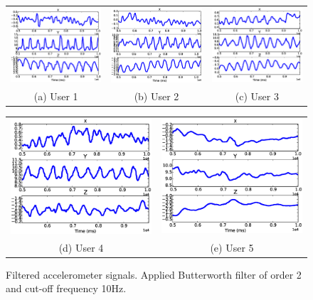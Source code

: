 \begin{figure}[t]
\begin{center}
\begin{tabular}{ccc}
\includegraphics [width=.33\linewidth]{fig/filer_sub1.eps}&
\includegraphics [width=.33\linewidth]{fig/filer_sub8.eps}&
\includegraphics [width=.33\linewidth]{fig/filer_sub3.eps}\\
(a) User 1& (b) User 2 & (c) User 3 \\
\end{tabular}

\begin{tabular}{cc}
\includegraphics [width=.33\linewidth]{fig/filer_sub4.eps}&
\includegraphics [width=.33\linewidth]{fig/filer_sub5.eps}\\
(d) User 4& (e) User 5 \\
\end{tabular}
\end{center}
\caption{Filtered accelerometer signals. Applied Butterworth
filter of order 2
and cut-off frequency 10Hz.\label{fig:filteredacc}}
\end{figure}


